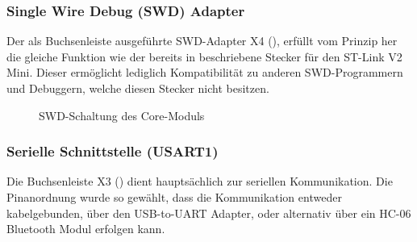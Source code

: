 
\subsubsection{Single Wire Debug (SWD) Adapter}
Der als Buchsenleiste ausgeführte SWD-Adapter X4 (), erfüllt vom Prinzip her die gleiche Funktion wie der bereits in  beschriebene Stecker für den ST-Link V2 Mini. Dieser ermöglicht lediglich Kompatibilität zu anderen SWD-Programmern und Debuggern, welche diesen Stecker nicht besitzen.

\begin{figure}[H]
    \centering
    \qquad
    \qquad
    \caption[SWD-Schaltung des Core-Moduls]{SWD-Schaltung des \gls{Core-Modul}s}
    \label{fig:coremodul-swd2}
\end{figure}

\subsubsection{Serielle Schnittstelle (USART1)}
Die Buchsenleiste X3 () dient hauptsächlich zur seriellen Kommunikation. Die Pinanordnung wurde so gewählt, dass die Kommunikation entweder kabelgebunden, über den \gls{USB-to-UART} Adapter, oder alternativ über ein HC-06 Bluetooth Modul erfolgen kann.

